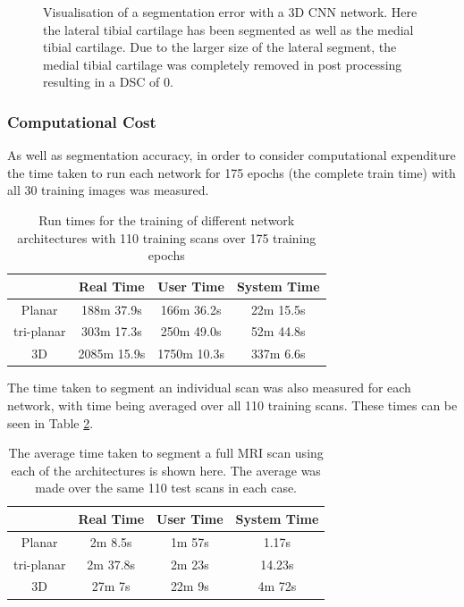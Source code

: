 \documentclass[11pt,a4paper]{memoir}
\numberwithin{figure}{section}
\numberwithin{table}{section}
\numberwithin{equation}{section}
\begin{document}
\begin{figure}[!h]
\begin{tabular}{cc}
\end{tabular}

\caption[Visualisation of medial tibial cartilage segmentation error using a 3D CNN architecture]{Visualisation of a segmentation error with a 3D CNN network. Here the lateral tibial cartilage has been segmented as well as the medial tibial cartilage. Due to the larger size of the lateral segment, the medial tibial cartilage was completely removed in post processing resulting in a DSC of 0.}
\label{3d-bad}
\end{figure}

\clearpage

\subsubsection{Computational Cost}
As well as segmentation accuracy, in order to consider computational expenditure the time taken to run each network for 175 epochs (the complete train time) with all 30 training images was measured.

\begin{table}[!ht]
\centering
\caption[Time taken to train each network architecture using CCBR data]{Run times for the training of different network architectures with 110 training scans over 175 training epochs}
\begin{tabular}{|c|c|c|c|}
\hline
 & Real Time   & User Time   & System Time \\ \hline
Planar                   & 188m 37.9s  & 166m 36.2s  & 22m 15.5s   \\ \hline
tri-planar                & 303m 17.3s  & 250m 49.0s  & 52m 44.8s   \\ \hline
3D                       & 2085m 15.9s & 1750m 10.3s & 337m 6.6s   \\ \hline
\end{tabular}
\label{time}
\end{table}

The time taken to segment an individual scan was also measured for each network, with time being averaged over all 110 training scans. These times can be seen in Table \ref{seg_time}.

\begin{table}[!ht]
\centering
\caption[Average time taken to segment an image using each network architecture using CCBR data]{The average time taken to segment a full MRI scan using each of the architectures is shown here. The average was made over the same 110 test scans in each case.}
\begin{tabular}{|c|c|c|c|}
\hline
 & Real Time   & User Time   & System Time \\ \hline
Planar                   & 2m 8.5s & 1m 57s    &  1.17s    \\ \hline
tri-planar                & 2m 37.8s  & 2m 23s  & 14.23s   \\ \hline
3D                       &  27m 7s& 22m 9s & 4m 72s\\ \hline
\end{tabular}


\label{seg_time}

\end{table}
\end{document}
